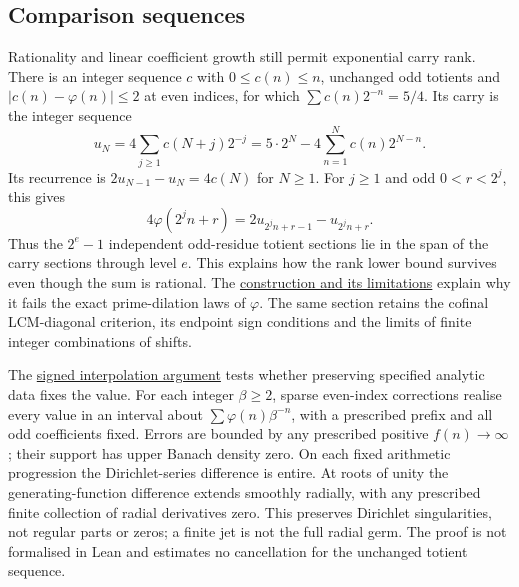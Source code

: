 \documentclass[11pt]{article}
\newcommand{\longrecord}[2]{\href{erdos249-totient-reasoning-surface.pdf\##1}{#2}}
\begin{document}
\subsection{Comparison sequences}\label{sec:nogo}\label{sec:signed-interpolation-transfer}
Rationality and linear coefficient growth still permit exponential
carry rank. There is an integer sequence $c$ with $0\le c(n)\le n$, unchanged odd totients and
$|c(n)-\varphi(n)|\le2$ at even indices, for which
$\sum c(n)2^{-n}=5/4$. Its carry is the integer sequence
\[
 u_N=4\sum_{j\ge1}c(N+j)2^{-j}
     =5\cdot2^N-4\sum_{n=1}^{N}c(n)2^{N-n}.
\]
Its recurrence is $2u_{N-1}-u_N=4c(N)$ for $N\ge1$.
For $j\ge1$ and odd $0<r<2^j$, this gives
\[
 4\varphi(2^jn+r)=2u_{2^jn+r-1}-u_{2^jn+r}.
\]
Thus the $2^e-1$ independent odd-residue totient sections lie in the
span of the carry sections through level $e$. This explains how the
rank lower bound survives even though the sum is rational.
The \longrecord{long249-r3-comparisons}{construction and its limitations}
explain why it fails the exact prime-dilation laws of $\varphi$.
The same section retains the cofinal LCM-diagonal criterion, its endpoint
sign conditions and the limits of finite integer combinations of shifts.

The \longrecord{long249-r3-interpolation}{signed interpolation
argument} tests whether preserving specified analytic data fixes the
value. For each integer $\beta\ge2$, sparse even-index corrections
realise every value in an interval about $\sum\varphi(n)\beta^{-n}$,
with a prescribed prefix and all odd coefficients fixed. Errors are
bounded by any prescribed positive $f(n)\to\infty$; their support has
upper Banach density zero. On each fixed arithmetic progression the
Dirichlet-series difference is entire. At roots of unity the
generating-function difference extends smoothly radially, with any
prescribed finite collection of radial derivatives zero. This preserves
Dirichlet singularities, not regular parts or zeros; a finite jet is
not the full radial germ. The proof is not formalised in Lean and
estimates no cancellation for the unchanged totient sequence.
\end{document}

